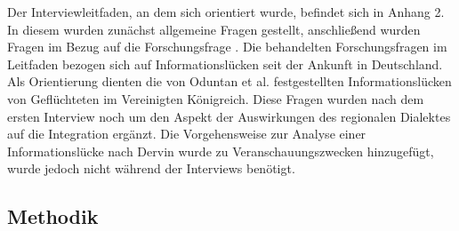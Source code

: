 

Der Interviewleitfaden, an dem sich orientiert wurde, befindet sich in Anhang 2. In diesem wurden zunächst allgemeine Fragen gestellt, anschließend wurden Fragen im Bezug auf die Forschungsfrage .\newline
Die behandelten Forschungsfragen im Leitfaden bezogen sich auf Informationslücken   seit der Ankunft in Deutschland. Als Orientierung dienten die von Oduntan et al. festgestellten Informationslücken von Geflüchteten im Vereinigten Königreich\cite{oduntan2017investigating}.\newline
Diese Fragen wurden nach dem ersten Interview noch um den Aspekt der Auswirkungen des regionalen Dialektes auf die Integration ergänzt.\newline
Die Vorgehensweise zur Analyse einer Informationslücke nach Dervin wurde zu Veranschauungszwecken hinzugefügt, wurde jedoch nicht während der Interviews benötigt.\cite{dervin2003sense}

\subsection{Methodik}

